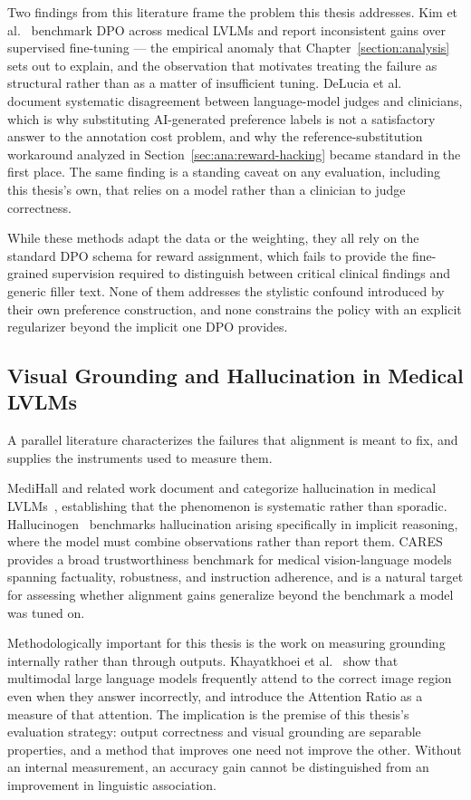 Two findings from this literature frame the problem this thesis addresses. Kim et al.~\cite{kim2026benchmarking} benchmark DPO across medical LVLMs and report inconsistent gains over supervised fine-tuning --- the empirical anomaly that Chapter~\ref{section:analysis} sets out to explain, and the observation that motivates treating the failure as structural rather than as a matter of insufficient tuning. DeLucia et al.~\cite{delucia2026same} document systematic disagreement between language-model judges and clinicians, which is why substituting AI-generated preference labels is not a satisfactory answer to the annotation cost problem, and why the reference-substitution workaround analyzed in Section~\ref{sec:ana:reward-hacking} became standard in the first place. The same finding is a standing caveat on any evaluation, including this thesis's own, that relies on a model rather than a clinician to judge correctness.

While these methods adapt the data or the weighting, they all rely on the standard DPO schema for reward assignment, which fails to provide the fine-grained supervision required to distinguish between critical clinical findings and generic filler text. None of them addresses the stylistic confound introduced by their own preference construction, and none constrains the policy with an explicit regularizer beyond the implicit one DPO provides.

\subsection{Visual Grounding and Hallucination in Medical LVLMs}
\label{sec:rel:grounding}

A parallel literature characterizes the failures that alignment is meant to fix, and supplies the instruments used to measure them.

MediHall and related work document and categorize hallucination in medical LVLMs~\cite{zhang2024medihall}, establishing that the phenomenon is systematic rather than sporadic. Hallucinogen~\cite{seth2025hallucinogen} benchmarks hallucination arising specifically in implicit reasoning, where the model must combine observations rather than report them. CARES~\cite{xia2024cares} provides a broad trustworthiness benchmark for medical vision-language models spanning factuality, robustness, and instruction adherence, and is a natural target for assessing whether alignment gains generalize beyond the benchmark a model was tuned on.

Methodologically important for this thesis is the work on measuring grounding internally rather than through outputs. Khayatkhoei et al.~\cite{khayatkhoei2025mllms} show that multimodal large language models frequently attend to the correct image region even when they answer incorrectly, and introduce the Attention Ratio as a measure of that attention. The implication is the premise of this thesis's evaluation strategy: output correctness and visual grounding are separable properties, and a method that improves one need not improve the other. Without an internal measurement, an accuracy gain cannot be distinguished from an improvement in linguistic association.

